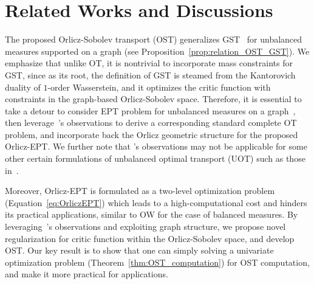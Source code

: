 \section{Related Works and Discussions}
\label{sec:related_works}

The proposed Orlicz-Sobolev transport (OST) generalizes GST~\citep{le2024generalized} for unbalanced measures supported on a graph (see Proposition~\ref{prop:relation_OST_GST}). We emphasize that unlike OT, it is nontrivial to incorporate mass constraints for GST, since as its root, the definition of GST is steamed from the Kantorovich duality of $1$-order Wasserstein, and it optimizes the critic function  with constraints in the graph-based Orlicz-Sobolev space. Therefore, it is essential to take a detour to consider EPT problem for unbalanced measures on a graph~\citep{le2023scalable}, then leverage~\citet{CM}'s observations to derive a corresponding standard complete OT problem, and incorporate back the Orlicz geometric structure for the proposed Orlicz-EPT. We further note that \citet{CM}'s observations may not be applicable for some other certain formulations of unbalanced optimal transport (UOT) such as those in~\citet{frogner2015learning, chizat2018unbalanced, sejourne2019sinkhorn}.


Moreover, Orlicz-EPT is formulated as a two-level optimization problem (Equation~\eqref{eq:OrliczEPT}) which leads to a high-computational cost and hinders its practical applications, similar to OW for the case of balanced measures. By leveraging~\citet{le2021ept}'s observations and exploiting graph structure, we propose novel regularization for critic function within the Orlicz-Sobolev space, and develop OST. Our key result is to show that one can simply solving a univariate optimization problem (Theorem~\ref{thm:OST_computation}) for OST computation, and make it more practical for applications. 




